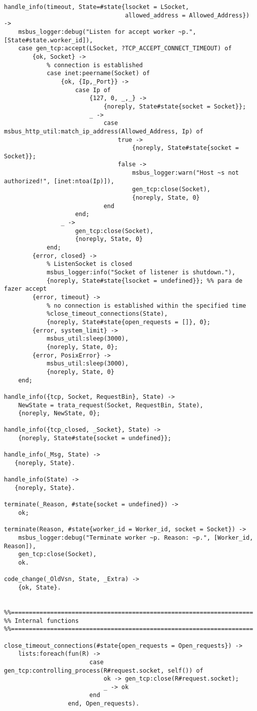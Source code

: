 \begin{lstlisting}
handle_info(timeout, State=#state{lsocket = LSocket, 
                                  allowed_address = Allowed_Address}) ->
    msbus_logger:debug("Listen for accept worker ~p.", [State#state.worker_id]),
	case gen_tcp:accept(LSocket, ?TCP_ACCEPT_CONNECT_TIMEOUT) of
		{ok, Socket} -> 
			% connection is established
			case inet:peername(Socket) of
				{ok, {Ip,_Port}} -> 
					case Ip of
						{127, 0, _,_} -> 
							{noreply, State#state{socket = Socket}};
						_ -> 
							case msbus_http_util:match_ip_address(Allowed_Address, Ip) of
								true -> 
									{noreply, State#state{socket = Socket}};
								false -> 
									msbus_logger:warn("Host ~s not authorized!", [inet:ntoa(Ip)]),
									gen_tcp:close(Socket),
									{noreply, State, 0}
							end
					end;
				_ -> 
					gen_tcp:close(Socket),
					{noreply, State, 0}
			end;
		{error, closed} -> 
			% ListenSocket is closed
			msbus_logger:info("Socket of listener is shutdown."),
			{noreply, State#state{lsocket = undefined}}; %% para de fazer accept
		{error, timeout} ->
			% no connection is established within the specified time
			%close_timeout_connections(State),
			{noreply, State#state{open_requests = []}, 0};
		{error, system_limit} ->
			msbus_util:sleep(3000),
			{noreply, State, 0};
		{error, PosixError} ->
			msbus_util:sleep(3000),
			{noreply, State, 0}
	end;

handle_info({tcp, Socket, RequestBin}, State) ->
	NewState = trata_request(Socket, RequestBin, State),
	{noreply, NewState, 0};

handle_info({tcp_closed, _Socket}, State) ->
	{noreply, State#state{socket = undefined}};

handle_info(_Msg, State) ->
   {noreply, State}.

handle_info(State) ->
   {noreply, State}.

terminate(_Reason, #state{socket = undefined}) ->
    ok;

terminate(Reason, #state{worker_id = Worker_id, socket = Socket}) ->
	msbus_logger:debug("Terminate worker ~p. Reason: ~p.", [Worker_id, Reason]),
	gen_tcp:close(Socket),
    ok.

code_change(_OldVsn, State, _Extra) ->
    {ok, State}.

	
%%====================================================================
%% Internal functions
%%====================================================================

close_timeout_connections(#state{open_requests = Open_requests}) ->
	lists:foreach(fun(R) -> 
						case gen_tcp:controlling_process(R#request.socket, self()) of
							ok -> gen_tcp:close(R#request.socket);
							_ -> ok
						end
				  end, Open_requests).
	


\end{lstlisting}
